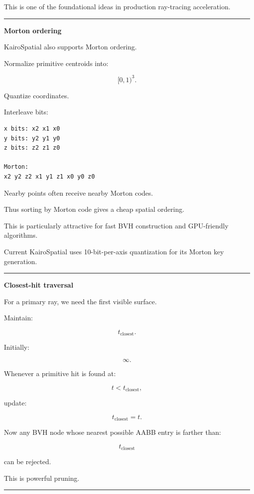 This is one of the foundational ideas in production ray-tracing acceleration.

\begin{center}\rule{0.5\linewidth}{0.5pt}\end{center}

\textbf{Morton ordering}

KairoSpatial also supports Morton ordering.

Normalize primitive centroids into:

\[
[0,1)^3.
\]

Quantize coordinates.

Interleave bits:

\begin{verbatim}
x bits: x2 x1 x0
y bits: y2 y1 y0
z bits: z2 z1 z0

Morton:
x2 y2 z2 x1 y1 z1 x0 y0 z0
\end{verbatim}

Nearby points often receive nearby Morton codes.

Thus sorting by Morton code gives a cheap spatial ordering.

This is particularly attractive for fast BVH construction and GPU-friendly algorithms.

Current KairoSpatial uses 10-bit-per-axis quantization for its Morton key generation.

\begin{center}\rule{0.5\linewidth}{0.5pt}\end{center}

\textbf{Closest-hit traversal}

For a primary ray, we need the first visible surface.

Maintain:

\[
t_{\text{closest}}.
\]

Initially:

\[
\infty.
\]

Whenever a primitive hit is found at:

\[
t<t_{\text{closest}},
\]

update:

\[
t_{\text{closest}}=t.
\]

Now any BVH node whose nearest possible AABB entry is farther than:

\[
t_{\text{closest}}
\]

can be rejected.

This is powerful pruning.

\begin{center}\rule{0.5\linewidth}{0.5pt}\end{center}

